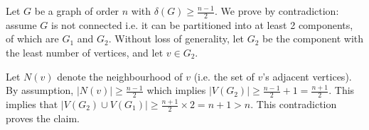 Let $G$ be a graph of order $n$ with $\delta \left(G\right) \geq \frac{n-1}{2}$. We prove by contradiction:
assume $G$ is not connected i.e. it can be partitioned into at least 2 components,
of which are $G_1$ and $G_2$. Without loss of generality, let $G_2$ be the component
with the least number of vertices, and let $v \in G_2$.

Let $N\left(v\right)$ denote the neighbourhood of $v$ (i.e. the set of $v$'s adjacent vertices).
By assumption, $|N\left(v\right)| \geq \frac{n-1}{2}$ which implies $|V\left(G_2\right)| \geq \frac{n-1}{2} + 1 = \frac{n+1}{2}$.
This implies that $|V\left(G_2\right) \cup V\left(G_1\right)| \geq \frac{n+1}{2} \times 2 = n+1 > n$.
This contradiction proves the claim.
